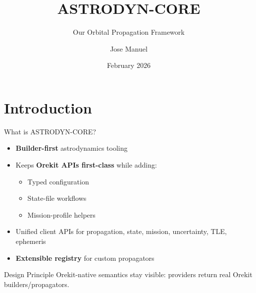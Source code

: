 \documentclass[aspectratio=169,12pt]{beamer}
\title{ASTRODYN-CORE}
\subtitle{Our Orbital Propagation Framework}
\author{Jose Manuel}
\date{February 2026}
\begin{document}
\begin{frame}
    \titlepage
\end{frame}

\section{Introduction}

\begin{frame}{What is ASTRODYN-CORE?}
    \begin{itemize}
        \item \textbf{Builder-first} astrodynamics tooling
        \item Keeps \textbf{Orekit APIs first-class} while adding:
        \begin{itemize}
            \item Typed configuration
            \item State-file workflows
            \item Mission-profile helpers
        \end{itemize}
        \item Unified client APIs for propagation, state, mission, uncertainty, TLE, ephemeris
        \item \textbf{Extensible registry} for custom propagators
    \end{itemize}
    
    \vspace{0.5cm}
    \begin{alertblock}{Design Principle}
        Orekit-native semantics stay visible: providers return real Orekit builders/propagators.
    \end{alertblock}
\end{frame}
\end{document}
